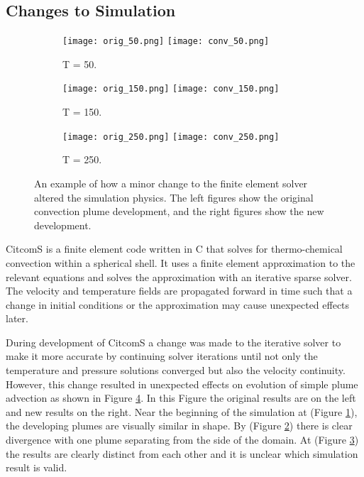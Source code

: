 \documentclass{acm_proc_article-sp}
\begin{document}
\subsection{Changes to Simulation}

\begin{figure}[!t]
\begin{subfigure}[h]{0.5\textwidth}
\centering
\texttt{[image: orig\_50.png]} \texttt{[image: conv\_50.png]}
\caption{T = 50.}
\label{fig-plume-comparison-a}
\end{subfigure}
\begin{subfigure}[b]{0.5\textwidth}
\centering
\texttt{[image: orig\_150.png]} \texttt{[image: conv\_150.png]}
\caption{T = 150.}
\label{fig-plume-comparison-b}
\end{subfigure}
\begin{subfigure}[b]{0.5\textwidth}
\centering
\texttt{[image: orig\_250.png]} \texttt{[image: conv\_250.png]}
\caption{T = 250.}
\label{fig-plume-comparison-c}
\end{subfigure}
\caption{An example of how a minor change to the finite element solver altered the simulation physics. The left figures show the original convection plume development, and the right figures show the new development.}
\label{fig-plume-comparison}
\end{figure}

CitcomS \cite{JGRB:JGRB12209,GGGE:GGGE831} is a finite element code written in C that solves for thermo-chemical convection within a spherical shell.  It uses a finite element approximation to the relevant equations and solves the approximation with an iterative sparse solver.  The velocity and temperature fields are propagated forward in time such that a change in initial conditions or the approximation may cause unexpected effects later.

During development of CitcomS a change was made to the iterative solver to make it more accurate by continuing solver iterations until not only the temperature and pressure solutions converged but also the velocity continuity. However, this change resulted in unexpected effects on evolution of simple plume advection as shown in Figure \ref{fig-plume-comparison}. In this Figure the original results are on the left and new results on the right.  Near the beginning of the simulation at  (Figure \ref{fig-plume-comparison-a}), the developing plumes are visually similar in shape.  By  (Figure \ref{fig-plume-comparison-b}) there is clear divergence with one plume separating from the side of the domain.  At  (Figure \ref{fig-plume-comparison-c}) the results are clearly distinct from each other and it is unclear which simulation result is valid.
\end{document}

